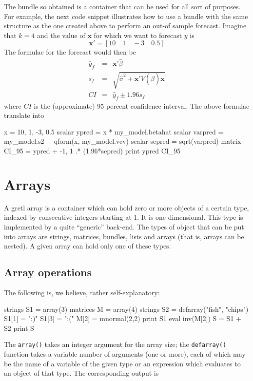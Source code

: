 The bundle so obtained is a container that can be used for all sort of
purposes. For example, the next code snippet illustrates how to use
a bundle with the same structure as the one created above to perform
an out-of sample forecast. Imagine that $k=4$ and the value of
$\mathbf{x}$ for which we want to forecast $y$ is
\[
  \mathbf{x}' = [ 10 \quad 1  \quad -3 \quad 0.5 ]
\]
The formulae for the forecast would then be
\begin{eqnarray*}
  \hat{y}_f & = & \mathbf{x}'\hat{\beta} \\
  s_f & = & \sqrt{\hat{\sigma}^2 + \mathbf{x}'V(\hat{\beta})\mathbf{x}} \\
  CI & = & \hat{y}_f \pm 1.96 s_f 
\end{eqnarray*}
where $CI$ is the (approximate) 95 percent confidence interval. The
above formulae translate into
\begin{code}
  x = { 10, 1, -3, 0.5 }
  scalar ypred    = x * my_model.betahat
  scalar varpred  = my_model.s2 + qform(x, my_model.vcv)
  scalar sepred   = sqrt(varpred)
  matrix CI_95    = ypred + {-1, 1} .* (1.96*sepred)
  print ypred CI_95
\end{code}

\section{Arrays}
\label{sec:arrays}

A gretl array is a container which can hold zero or more objects of a
certain type, indexed by consecutive integers starting at 1. It is
one-dimensional. This type is implemented by a quite ``generic''
back-end. The types of object that can be put into arrays are strings,
matrices, bundles, lists and arrays (that is, arrays can be nested). A
given array can hold only one of these types.

\subsection{Array operations}

The following is, we believe, rather self-explanatory:

\begin{code}
strings S1 = array(3)
matrices M = array(4)
strings S2 = defarray("fish", "chips")
S1[1] = ":)"
S1[3] = ":("
M[2] = mnormal(2,2)
print S1
eval inv(M[2])
S = S1 + S2
print S
\end{code}

The \texttt{array()} takes an integer argument for the array size; the
\texttt{defarray()} function takes a variable number of arguments (one
or more), each of which may be the name of a variable of the given
type or an expression which evaluates to an object of that type.  The
corresponding output is


